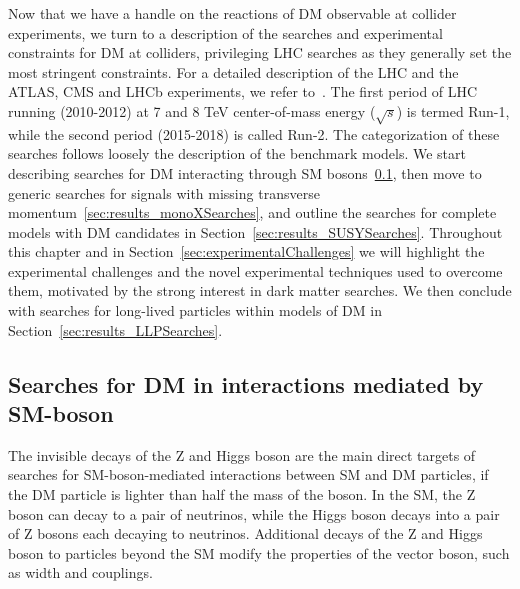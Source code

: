 Now that we have a handle on the reactions of DM observable at collider experiments, we turn to a description of the searches and experimental constraints for DM at colliders, privileging LHC searches as they generally set the most stringent constraints. For a detailed description of the LHC and the ATLAS, CMS and LHCb experiments, we refer to~\cite{LHC2008,ATLAS2008,CMS2008}. %
The first period of LHC running (2010-2012) at 7 and 8 TeV center-of-mass energy ($\sqrt{s}$) is termed Run-1, while the second period (2015-2018) is called Run-2. 
The categorization of these searches follows loosely the description of the benchmark models. We start describing searches for DM interacting through SM bosons~\ref{sec:results_ZHSearches}, then move to generic searches for signals with missing transverse momentum~\ref{sec:results_monoXSearches}, and outline the searches for complete models with DM candidates in Section~\ref{sec:results_SUSYSearches}. Throughout this chapter and in Section~\ref{sec:experimentalChallenges} we will highlight the experimental challenges and the novel experimental techniques used to overcome them, motivated by the strong interest in dark matter searches. 
We then conclude with searches for long-lived particles within models of DM in
Section~\ref{sec:results_LLPSearches}. %

\subsection{Searches for DM in interactions mediated by SM-boson}
\label{sec:results_ZHSearches}

The invisible decays of the Z and Higgs boson are the main direct targets of searches for SM-boson-mediated interactions between SM and DM particles, if the DM particle is lighter than half the mass of the boson. 
In the SM, the Z boson can decay to a pair of neutrinos, while the Higgs boson decays into a pair of Z bosons each decaying to neutrinos. Additional decays of the Z and Higgs boson to particles beyond the SM modify the properties of the vector boson, such as width and couplings. 


